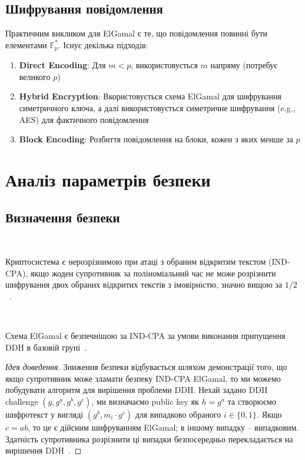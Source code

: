 \subsection{Шифрування повідомлення}

Практичним викликом для ElGamal є те, що повідомлення повинні бути елементами $\mathbb{F}_p^*$. Існує декілька підходів:

\begin{enumerate}
    \item \textbf{Direct Encoding}: Для $m < p$, використовується $m$ напряму (потребує великого $p$)
    \item \textbf{Hybrid Encryption}: Вкористовується схема ElGamal для шифрування симетричного ключа, а далі 
        використовується симетричне шифрування (e.g., AES) для фактичного повідомлення~\cite{cryptoeprint:2001/108}
    \item \textbf{Block Encoding}: Розбиття повідомлення на блоки, кожен з яких менше за $p$
\end{enumerate}

\section{Аналіз параметрів безпеки}

\subsection{Визначення безпеки}

\begin{definition}
    ~\par Криптосистема є нерозрізнимою при атаці з обраним відкритим текстом (IND-CPA), якщо жоден супротивник за 
    поліноміальний час не може розрізнити шифрування двох обраних відкритих текстів з імовірністю, значно вищою 
    за $1/2$~\cite{goldwasser1984probabilistic}.
\end{definition}

\begin{theorem}
    ~\par Схема ElGamal є безпечнішою за IND-CPA за умови виконання припущення DDH в базовій групі~\cite{tsiounis1998security}.
\end{theorem}

\begin{proof}[Ідея доведення]
    Зниження безпеки відбувається шляхом демонстрації того, що якщо супротивник може зламати безпеку IND-CPA ElGamal, то ми 
    можемо побудувати алгоритм для вирішення проблеми DDH. Нехай задано DDH challenge $(g, g^a, g^b, g^c)$, ми визначаємо 
    public key як $h = g^a$ та створюємо шифротекст у вигляді $(g^b, m_i \cdot g^c)$ для випадково обраного $i \in \{0,1\}$. 
    Якщо $c = ab$, то це є дійсним шифруванням ElGamal; в іншому випадку -- випадковим. Здатність супротивника розрізнити 
    ці випадки безпосередньо перекладається на вирішення DDH~\cite{tsiounis1998security}.
\end{proof}

